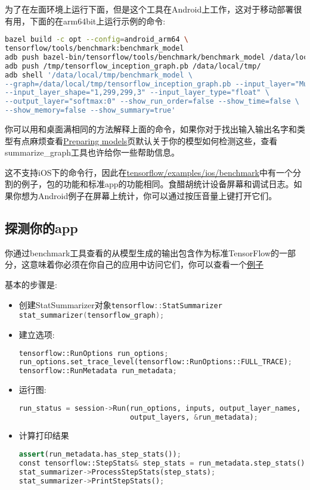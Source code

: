 为了在左面环境上运行下面，但是这个工具在Android上工作，这对于移动部署很有用，下面的在arm64bit上运行示例的命令:
\begin{lstlisting}[language=Bash]
bazel build -c opt --config=android_arm64 \ 
tensorflow/tools/benchmark:benchmark_model
adb push bazel-bin/tensorflow/tools/benchmark/benchmark_model /data/local/tmp
adb push /tmp/tensorflow_inception_graph.pb /data/local/tmp/
adb shell '/data/local/tmp/benchmark_model \
--graph=/data/local/tmp/tensorflow_inception_graph.pb --input_layer="Mul" \
--input_layer_shape="1,299,299,3" --input_layer_type="float" \
--output_layer="softmax:0" --show_run_order=false --show_time=false \
--show_memory=false --show_summary=true'
\end{lstlisting}
你可以用和桌面满相同的方法解释上面的命令，如果你对于找出输入输出名字和类型有点麻烦查看\href{https://www.tensorflow.org/mobile/prepare_models?hl=zh-cn}{Preparing models}页默认关于你的模型如何检测这些，查看summarize\_graph工具也许给你一些帮助信息。

这不支持iOS下的命令行，因此在\href{https://www.github.com/tensorflow/tensorflow/blob/r1.4/tensorflow/examples/ios/benchmark}{tensorflow/examples/ios/benchmark}中有一个分割的例子，包的功能和标准app的功能相同。食醋胡统计设备屏幕和调试日志。如果你想为Android例子在屏幕上统计，你可以通过按压音量上键打开它们。

\subsection{探测你的app}
你通过benchmark工具查看的从模型生成的输出包含作为标准TensorFlow的一部分，这意味着你必须在你自己的应用中访问它们，你可以查看一个\href{https://www.github.com/tensorflow/tensorflow/blob/r1.4/tensorflow/examples/ios/benchmark/BenchmarkViewController.mm?l=139}{例子}

基本的步骤是:
\begin{itemize}
\item 创建StatSummarizer对象\lstinline[language=C++]{tensorflow::StatSummarizer stat_summarizer(tensorflow_graph);}
\item 建立选项:
\begin{lstlisting}[language=Python]
tensorflow::RunOptions run_options;
run_options.set_trace_level(tensorflow::RunOptions::FULL_TRACE);
tensorflow::RunMetadata run_metadata;
\end{lstlisting}
\item 运行图:
\begin{lstlisting}[language=Python]
run_status = session->Run(run_options, inputs, output_layer_names, {},
                          output_layers, &run_metadata);

\end{lstlisting}
\item 计算打印结果\begin{lstlisting}[language=Python]
assert(run_metadata.has_step_stats());
const tensorflow::StepStats& step_stats = run_metadata.step_stats();
stat_summarizer->ProcessStepStats(step_stats);
stat_summarizer->PrintStepStats();
\end{lstlisting}
\end{itemize}
